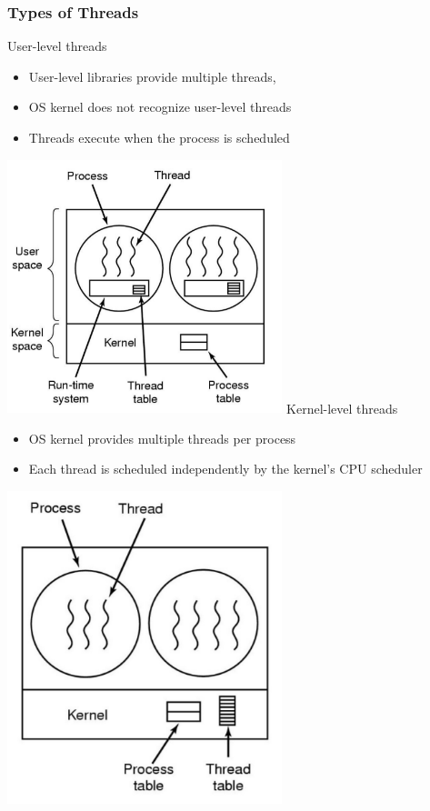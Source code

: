\documentclass[12pt]{article}
\begin{document}
\subsubsection{Types of Threads}
User-level threads
\begin{itemize}
    \item User-level libraries provide multiple threads,
    \item OS kernel does not recognize user-level threads
    \item Threads execute when the process is scheduled
\end{itemize}
\includegraphics[width=0.6\textwidth]{UserLevelThreads.png}
\newline
Kernel-level threads
\begin{itemize}
    \item OS kernel provides multiple threads per process
    \item Each thread is scheduled independently by the kernel’s CPU scheduler
\end{itemize}
\includegraphics[width=0.6\textwidth]{KernelLevelThreads.png}
\end{document}
